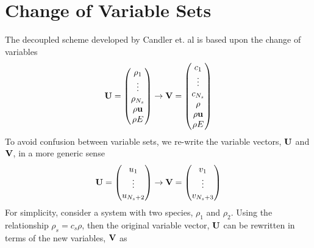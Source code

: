 \chapter{Change of Variable Sets}
\label{change-of-var-section}

The decoupled scheme developed by Candler et. al\cite{candler} is based upon the
change of variables
\begin{equation}
  \mathbf U = \begin{pmatrix}
    \rho_1 \\
    \vdots \\
    \rho_{N_s} \\
    \rho \mathbf u \\
    \rho E
  \end{pmatrix}
  \rightarrow
  \mathbf V = \begin{pmatrix}
    c_1 \\
    \vdots \\
    c_{N_s} \\
    \rho \\
    \rho \mathbf u \\
    \rho E
  \end{pmatrix}
  \label{var-sets}
\end{equation}
To avoid confusion between variable sets, we re-write the variable vectors,
$\mathbf U$ and $\mathbf V$, in a more generic sense
\begin{equation}
  \mathbf U = \begin{pmatrix}
    u_1 \\
    \vdots \\
    u_{N_s + 2}
  \end{pmatrix}
  \rightarrow
  \mathbf V = \begin{pmatrix}
    v_1 \\
    \vdots \\
    v_{N_s + 3}
  \end{pmatrix}
  \label{generic-var-sets}
\end{equation}
For simplicity, consider a system with two species, $\rho_1$ and $\rho_2$.
Using the relationship $\rho_s = c_s \rho$, then the original variable vector,
$\mathbf U$ can be rewritten in terms of the new variables, $\mathbf V$ as

